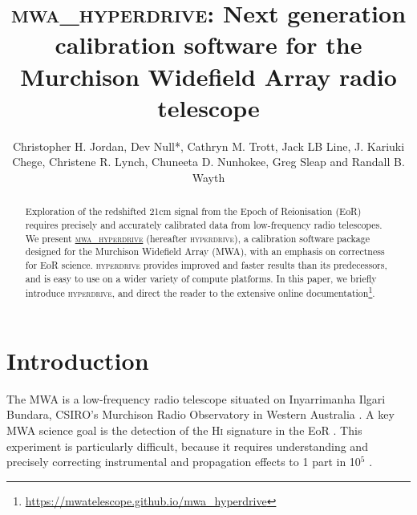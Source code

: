 \documentclass[summary]{ursi}
\title{\textsc{mwa\_hyperdrive}: Next generation calibration software for the Murchison Widefield Array radio telescope}
\author{Christopher H. Jordan\affref{ref1}\affref{ref2}, Dev Null*\affref{ref1}\affref{ref2}\affref{ref3}, Cathryn M. Trott\affref{ref1}\affref{ref2}, Jack LB Line\affref{ref1}\affref{ref2}, J. Kariuki Chege\affref{ref1}\affref{ref2}\affref{ref5}, Christene R. Lynch\affref{ref1}\affref{ref2}\affref{ref6}, Chuneeta D. Nunhokee\affref{ref1}\affref{ref2}, Greg Sleap\affref{ref1} and Randall B. Wayth\affref{ref1}\affref{ref2}\affref{ref4}}
\affiliation{%
  \aff{ref1}{International Centre for Radio Astronomy Research, Curtin University, Bentley, WA 6102, Australia}
  \aff{ref2}{ARC Centre of Excellence for All Sky Astrophysics in 3 Dimensions (ASTRO 3D), Bentley, Australia}
  \aff{ref3}{Australian SKA Regional Centre (AusSRC), Curtin University, Bentley, WA, Australia}
  \aff{ref4}{SKA Observatory, Kensington WA, Australia}
  \aff{ref5}{Kapteyn Institute, University of Groningen, Netherlands}
  \aff{ref6}{Department of Physics and Astronomy, University of North Carolina Asheville, Asheville, NC 28804, USA}
}
\newcommand{\hyperdrive}{\textsc{hyperdrive}}\newcommand{\mwalib}{\textsc{mwalib}}
\begin{document}
\maketitle


\begin{abstract}

Exploration of the redshifted 21cm signal from the Epoch of Reionisation (EoR)  requires precisely and accurately calibrated data from low-frequency radio telescopes. 
We present \href{https://github.com/MWATelescope/mwa_hyperdrive}{\textsc{mwa\_hyperdrive}} (hereafter \hyperdrive{}), a calibration software package designed for the Murchison Widefield Array (MWA), with an emphasis on correctness for EoR science. 
\hyperdrive{} provides improved and faster results than its predecessors, and is easy to use on a wider variety of compute platforms.
In this paper, we briefly introduce \hyperdrive{}, and direct the reader to the extensive online documentation\footnote{\url{https://mwatelescope.github.io/mwa_hyperdrive}}.
\end{abstract}

\section{Introduction}
The MWA is a low-frequency radio telescope situated on Inyarrimanha Ilgari Bundara, CSIRO's Murchison Radio Observatory in Western Australia \cite{tingay2013}. 
A key MWA science goal is the detection of the H\textsc{i} signature in the EoR \cite{beardsley2019}. 
This experiment is particularly difficult, because it requires understanding and precisely correcting instrumental and propagation effects to 1 part in 10$^5$ \cite{barry2016}. 
\end{document}
